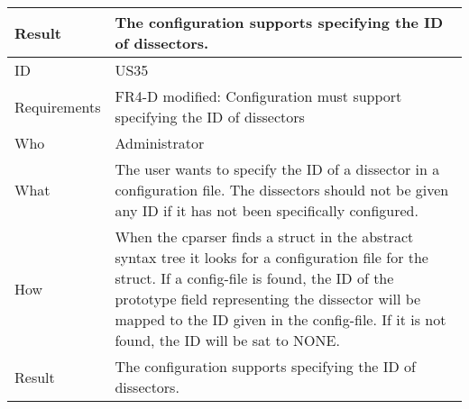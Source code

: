 \begin{table}[htbp]
{\begin{tabularx}{1.2\textwidth}{l X}
	Result & The configuration supports specifying the ID of dissectors. \\
	\bottomrule
	ID & US35 \\
	Requirements & FR4-D modified: Configuration must support specifying the ID of dissectors \\
	Who & Administrator \\
	What & The user wants to specify the ID of a dissector in a configuration file. The dissectors should not be given any ID if it has not been 			specifically configured. \\
	How & When the cparser finds a struct in the abstract syntax tree it looks for a configuration file for the struct. If a config-file is found, the 			ID of the prototype field representing the dissector will be mapped to the ID given in the config-file.  If it is not found, the ID will be sat to 			NONE. \\
	Result & The configuration supports specifying the ID of dissectors. \\
	\bottomrule
\end{tabularx}}
\end{table}

